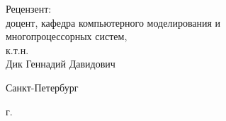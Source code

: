 \begin{titlepage}
\begin{center}
\begin{flushright}
\begin{minipage}[t]{0.65\textwidth}
\vspace{10mm}

{Рецензент:} \\
доцент, кафедра компьютерного моделирования и \\многопроцессорных систем,\\к.т.н.\\Дик Геннадий Давидович
\end{minipage}
\end{flushright}

\vfill 

{Санкт-Петербург}
\par{\the\year{} г.}
\end{center}
\end{titlepage}
\restoregeometry
\addtocounter{page}{1}

